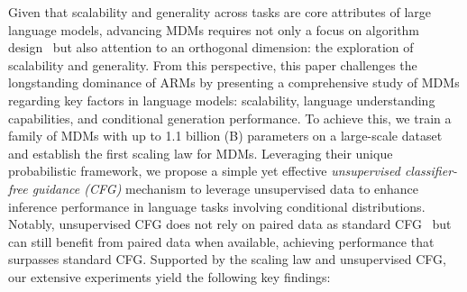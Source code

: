 \documentclass{article} %
\begin{document}
Given that scalability and generality across tasks are core attributes of large language models, advancing MDMs requires not only a focus on algorithm design~\citep{austin2021structured, lou2023discrete, sahoo2024simple, shi2024simplified, ou2024your} but also attention to an orthogonal dimension: the exploration of scalability and generality. From this perspective, this paper challenges the longstanding dominance of ARMs by presenting a comprehensive study of MDMs regarding key factors in language models: scalability, language understanding capabilities, and conditional generation performance.
To achieve this, we train a family of MDMs with up to 1.1 billion (B) parameters on a large-scale dataset and establish the first scaling law for MDMs. 
Leveraging their unique probabilistic framework, we propose a simple yet effective \emph{unsupervised classifier-free guidance (CFG)} mechanism to leverage unsupervised data to enhance inference performance in language tasks involving conditional distributions. Notably, unsupervised CFG does not rely on paired data as standard CFG~\citep{ho2022classifier} but can still benefit from paired data when available, achieving performance that surpasses standard CFG. Supported by the scaling law and unsupervised CFG, our extensive experiments yield the following key findings:
\end{document}
